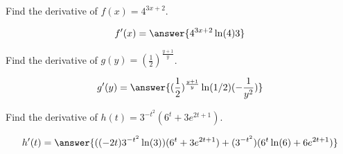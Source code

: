 \documentclass{ximera}
\author{Bobby Ramsey}
\begin{document}
\begin{exercise}
	Find the derivative of $\displaystyle f(x) = 4^{3x+2}$.
	
	\[ f'(x) = \answer{4^{3x+2}\ln(4)3} \]
\end{exercise}

\begin{exercise}
	Find the derivative of $\displaystyle g(y) = \left(\frac{1}{2}\right)^{\frac{y+1}{y} }$.

	\[ g'(y) = \answer{ (\frac{1}{2})^{\frac{y+1}{y}} \ln(1/2) ( -\frac{1}{y^2} ) }\]
\end{exercise}

\begin{exercise}
	Find the derivative of $\displaystyle h(t) = 3^{-t^2}\left(6^t+3e^{2t+1}\right)$.
	
	\[ h'(t) = \answer{ ((-2t)3^{-t^2}\ln(3))(6^t+3e^{2t+1})+(3^{-t^2})(6^t \ln(6) + 6e^{2t+1}) } \]
\end{exercise}
\end{document}
